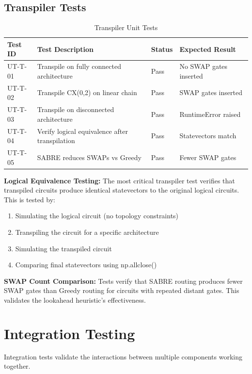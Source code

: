 \subsection{Transpiler Tests}

\begin{table}[h]
\centering
\caption{Transpiler Unit Tests}
\begin{tabular}{|p{2cm}|p{5cm}|p{2cm}|p{3cm}|}
\hline
\textbf{Test ID} & \textbf{Test Description} & \textbf{Status} & \textbf{Expected Result} \\
\hline
UT-T-01 & Transpile on fully connected architecture & Pass & No SWAP gates inserted \\
\hline
UT-T-02 & Transpile CX(0,2) on linear chain & Pass & SWAP gates inserted \\
\hline
UT-T-03 & Transpile on disconnected architecture & Pass & RuntimeError raised \\
\hline
UT-T-04 & Verify logical equivalence after transpilation & Pass & Statevectors match \\
\hline
UT-T-05 & SABRE reduces SWAPs vs Greedy & Pass & Fewer SWAP gates \\
\hline
\end{tabular}
\end{table}

\textbf{Logical Equivalence Testing:} The most critical transpiler test verifies that transpiled circuits produce identical statevectors to the original logical circuits. This is tested by:
\begin{enumerate}
\item Simulating the logical circuit (no topology constraints)
\item Transpiling the circuit for a specific architecture
\item Simulating the transpiled circuit
\item Comparing final statevectors using np.allclose()
\end{enumerate}

\textbf{SWAP Count Comparison:} Tests verify that SABRE routing produces fewer SWAP gates than Greedy routing for circuits with repeated distant gates. This validates the lookahead heuristic's effectiveness.

\section{Integration Testing}
Integration tests validate the interactions between multiple components working together.

